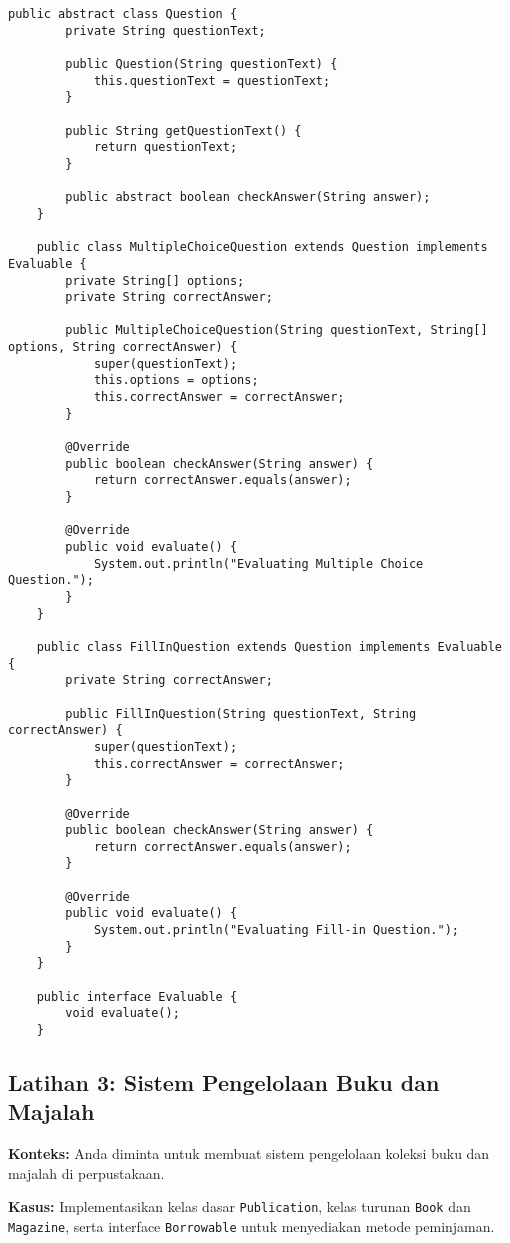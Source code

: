 \begin{lstlisting}[style=JavaStyle]
	public abstract class Question {
		private String questionText;
		
		public Question(String questionText) {
			this.questionText = questionText;
		}
		
		public String getQuestionText() {
			return questionText;
		}
		
		public abstract boolean checkAnswer(String answer);
	}
	
	public class MultipleChoiceQuestion extends Question implements Evaluable {
		private String[] options;
		private String correctAnswer;
		
		public MultipleChoiceQuestion(String questionText, String[] options, String correctAnswer) {
			super(questionText);
			this.options = options;
			this.correctAnswer = correctAnswer;
		}
		
		@Override
		public boolean checkAnswer(String answer) {
			return correctAnswer.equals(answer);
		}
		
		@Override
		public void evaluate() {
			System.out.println("Evaluating Multiple Choice Question.");
		}
	}
	
	public class FillInQuestion extends Question implements Evaluable {
		private String correctAnswer;
		
		public FillInQuestion(String questionText, String correctAnswer) {
			super(questionText);
			this.correctAnswer = correctAnswer;
		}
		
		@Override
		public boolean checkAnswer(String answer) {
			return correctAnswer.equals(answer);
		}
		
		@Override
		public void evaluate() {
			System.out.println("Evaluating Fill-in Question.");
		}
	}
	
	public interface Evaluable {
		void evaluate();
	}
\end{lstlisting}

\subsection{Latihan 3: Sistem Pengelolaan Buku dan Majalah}

\textbf{Konteks:} Anda diminta untuk membuat sistem pengelolaan koleksi buku dan majalah di perpustakaan.

\textbf{Kasus:} Implementasikan kelas dasar \texttt{Publication}, kelas turunan \texttt{Book} dan \texttt{Magazine}, serta interface \texttt{Borrowable} untuk menyediakan metode peminjaman.

